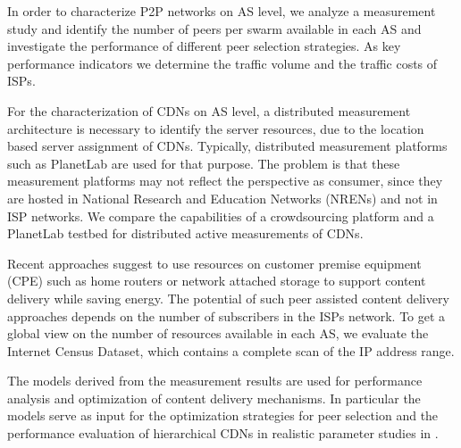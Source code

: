 In order to characterize P2P networks on AS level, we analyze a measurement study and identify the number of peers per swarm available in each AS and investigate the performance of different peer selection strategies.
As key performance indicators we determine the traffic volume and the traffic costs of ISPs.

For the characterization of CDNs on AS level, a distributed measurement architecture is necessary to identify the server resources, due to the location based server assignment of CDNs.
Typically, distributed measurement platforms such as PlanetLab are used for that purpose.
The problem is that these measurement platforms may not reflect the perspective as consumer, since they are hosted in National Research and Education Networks (NRENs) and not in ISP networks.
We compare the capabilities of a crowdsourcing platform and a PlanetLab testbed for distributed active measurements of CDNs.

Recent approaches \cite{valancius2009greening} suggest to use resources on customer premise equipment (CPE) such as home routers or network attached storage to support content delivery while saving energy.
The potential of such peer assisted content delivery approaches depends on the number of subscribers in the ISPs network.
To get a global view on the number of resources available in each AS, we evaluate the Internet Census Dataset, which contains a complete scan of the IP address range.


The models derived from the measurement results are used for performance analysis and optimization of content delivery mechanisms.
In particular the models serve as input for the optimization strategies for peer selection and the performance evaluation of hierarchical CDNs in realistic parameter studies in .

